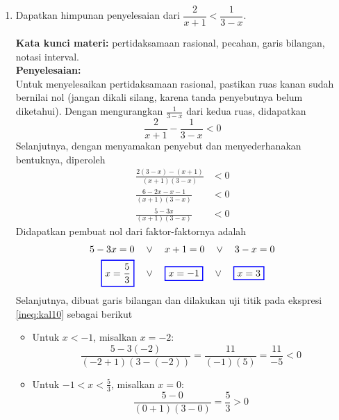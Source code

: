 \documentclass[10pt,openany,a4paper]{article}
\theoremstyle{definition}
\theoremstyle{definition}
\theoremstyle{plain}
\newenvironment{jawab}[2][tes]{%
\par\noindent\textbf{Kata kunci materi:} #1.\\
\textbf{Penyelesaian:} #2%
}{}
\begin{document}
\newpage

\begin{enumerate}
    \item Dapatkan himpunan penyelesaian dari $\dfrac{2}{x+1}<\dfrac{1}{3-x}$.
    \begin{jawab}[pertidaksamaan rasional, pecahan, garis bilangan, notasi interval]{~\\
        Untuk menyelesaikan pertidaksamaan rasional, pastikan ruas kanan sudah bernilai nol (jangan dikali silang, karena tanda penyebutnya belum diketahui). Dengan mengurangkan \(\frac{1}{3-x}\) dari kedua ruas, didapatkan
        \[
        \frac{2}{x+1} - \frac{1}{3-x} < 0
        \]
        Selanjutnya, dengan menyamakan penyebut dan menyederhanakan bentuknya, diperoleh
        \begin{align}
            \frac{2(3-x)-(x+1)}{(x+1)(3-x)} &< 0\nonumber\\
            \frac{6-2x-x-1}{(x+1)(3-x)} &< 0\nonumber \\
            \frac{5-3x}{(x+1)(3-x)} &< 0 \label{ineq:kal10}
        \end{align}
        Didapatkan pembuat nol dari faktor-faktornya adalah
        \begin{align*}
            5-3x = 0 \quad &\vee\quad  x+1 = 0 \quad\vee\quad 3-x=0\\
            \colorlet{oldcolor}{.}
        \color{blue}
        \setlength{\fboxrule}{1pt} \boxed{\color{oldcolor}x=\frac{5}{3}}\color{oldcolor} \quad &\vee\quad \colorlet{oldcolor}{.}
        \color{blue}
        \setlength{\fboxrule}{1pt} \boxed{\color{oldcolor}x=-1}\color{oldcolor} \quad\vee\quad \colorlet{oldcolor}{.}
        \color{blue}
        \setlength{\fboxrule}{1pt} \boxed{\color{oldcolor}x=3}\color{oldcolor}
        \end{align*}
        Selanjutnya, dibuat garis bilangan dan dilakukan uji titik pada ekspresi \eqref{ineq:kal10} sebagai berikut
        \begin{itemize}
            \item Untuk \(x < -1\), misalkan \(x = -2\):
            \[
            \frac{5-3(-2)}{(-2+1)(3-(-2))} = \frac{11}{(-1)(5)} = \frac{11}{-5} < 0
            \]
            \item Untuk \(-1 < x < \frac{5}{3}\), misalkan \(x = 0\):
            \[
            \frac{5-0}{(0+1)(3-0)} = \frac{5}{3} > 0
\]
\end{itemize}}
\end{jawab}
\end{enumerate}
\end{document}
